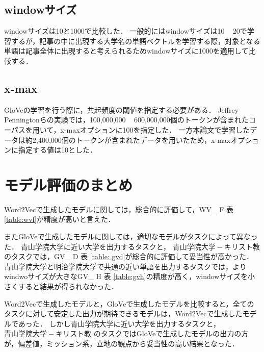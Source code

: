 \subsection{windowサイズ}
windowサイズは10と1000で比較した．
一般的にはwindowサイズは10 ~ 20で学習するが，記事の中に出現する大学名の単語ベクトルを学習する際，対象となる単語は記事全体に出現すると考えられるためwindowサイズに1000を適用して比較する．

\subsection{x-max}
GloVeの学習を行う際に，共起頻度の閾値を指定する必要がある．
Jeffrey Penningtonらの実験では，100,000,000 ~ 600,000,000個のトークンが含まれたコーパスを用いて，x-maxオプションに100を指定した．
一方本論文で学習したデータは約2,400,000個のトークンが含まれたデータを用いたため，x-maxオプションに指定する値は10とした．










\section{モデル評価のまとめ}
Word2Vecで生成したモデルに関しては，総合的に評価して，WV\_ F 表 \ref{table:wvf}が精度が高いと言えた．

またGloVeで生成したモデルに関しては，適切なモデルがタスクによって異なった．
青山学院大学に近い大学を出力するタスクと， $ 青山学院大学 - キリスト教 $ のタスクでは，GV\_ D 表 \ref{table: gvd}が総合的に評価して妥当性が高かった．
青山学院大学と明治学院大学で共通の近い単語を出力するタスクでは，よりwindwoサイズが大きなGV\_ H 表 \ref{table:gvh}の精度が高く，windowサイズを小さくすると結果が得られなかった．

Word2Vecで生成したモデルと，GloVeで生成したモデルを比較すると，全てのタスクに対して安定した出力が期待できるモデルは，Word2Vecで生成したモデルであった．
しかし青山学院大学に近い大学を出力するタスクと， $ 青山学院大学 - キリスト教 $ のタスクではGloVeで生成したモデルの出力の方が，偏差値，ミッション系，立地の観点から妥当性の高い結果となった．
